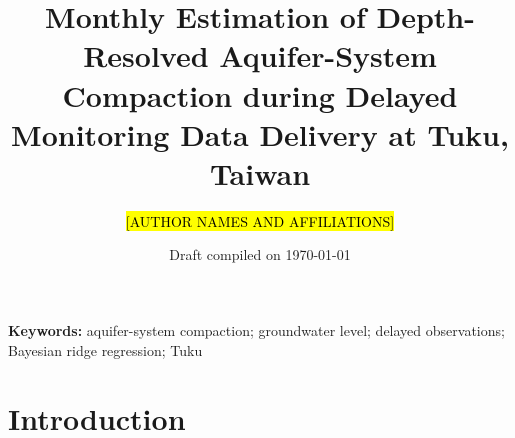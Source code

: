 \documentclass[12pt,oneside]{article}
\newcommand{\keywords}[1]{\vspace{2mm}\noindent\textbf{Keywords:} #1}
\newcommand{\placeholder}[1]{\begingroup\sethlcolor{yellow}\hl{[#1]}\endgroup}
\begin{document}
\title{\textbf{Monthly Estimation of Depth-Resolved Aquifer-System Compaction during Delayed Monitoring Data Delivery at Tuku, Taiwan}}
\author{\placeholder{AUTHOR NAMES AND AFFILIATIONS}}
\date{Draft compiled on \today}
\maketitle

\begin{abstract}
\end{abstract}

\keywords{aquifer-system compaction; groundwater level; delayed observations; Bayesian ridge regression; Tuku}

\tableofcontents
\listoffigures
\listoftables
\clearpage

\setcounter{page}{1}
\linenumbers

\section{Introduction}
\label{sec:introduction}

\end{document}
